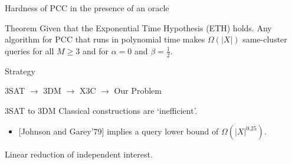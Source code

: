 \documentclass{beamer}
\begin{document}
\begin{frame}{Hardness of PCC in the presence of an oracle}
	\begin{block}{Theorem}
		Given that the Exponential Time Hypothesis (ETH) holds. Any algorithm for PCC that runs in polynomial time makes $\Omega(|X|)$ same-cluster queries for all $M \ge 3$ and for $\alpha = 0$ and $\beta = \frac{1}{2}$. 
	\end{block}
	\vspace{20pt}Strategy
	
	\vspace{5pt}\begin{center}\LARGE {3SAT $\longrightarrow$ 3DM $\longrightarrow$ X3C $\longrightarrow$ Our Problem}\end{center}
	
\end{frame}

\begin{frame}{3SAT to 3DM}
	Classical constructions are `inefficient'.\\
	\begin{itemize}
	\vspace{10pt}\item \alert{[Johnson and Garey'79]} implies a query lower bound of $\Omega(|X|^{0.25})$.
	\end{itemize}
	
	\vspace{30pt}Linear reduction of independent interest.	
\end{frame}
\end{document}
